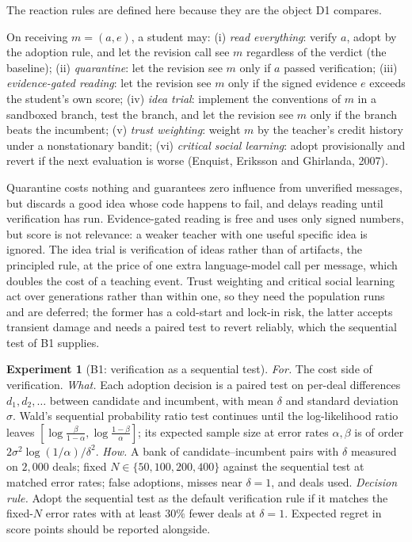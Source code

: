 \documentclass[11pt]{article}
\numberwithin{theorem}{section}
\theoremstyle{definition}
\theoremstyle{problemstyle}
\newtheorem{experiment}{Experiment}[section]
\begin{document}
The reaction rules are defined here because they are the object D1 compares.

\begin{definition}
On receiving $m=(a,e)$, a student may: (i) \emph{read everything}: verify $a$, adopt by the adoption rule, and let the
revision call see $m$ regardless of the verdict (the baseline); (ii) \emph{quarantine}: let the revision see $m$ only
if $a$ passed verification; (iii) \emph{evidence-gated reading}: let the revision see $m$ only if the signed evidence
$e$ exceeds the student's own score; (iv) \emph{idea trial}: implement the conventions of $m$ in a sandboxed branch, test
the branch, and let the revision see $m$ only if the branch beats the incumbent; (v) \emph{trust weighting}: weight
$m$ by the teacher's credit history under a nonstationary bandit; (vi) \emph{critical social learning}: adopt
provisionally and revert if the next evaluation is worse (Enquist, Eriksson and Ghirlanda, 2007).
\end{definition}

\begin{remark}
Quarantine costs nothing and guarantees zero influence from unverified messages, but discards a good idea whose code
happens to fail, and delays reading until verification has run. Evidence-gated reading is free and uses only signed
numbers, but score is not relevance: a weaker teacher with one useful specific idea is ignored. The idea trial is
verification of ideas rather than of artifacts, the principled rule, at the price of one extra language-model call per
message, which doubles the cost of a teaching event. Trust weighting and critical social learning act over
generations rather than within one, so they need the population runs and are deferred; the former has a cold-start
and lock-in risk, the latter accepts transient damage and needs a paired test to revert reliably, which the sequential
test of B1 supplies.
\end{remark}

\begin{experiment}[B1: verification as a sequential test]
\emph{For.} The cost side of verification.
\emph{What.} Each adoption decision is a paired test on per-deal differences $d_1,d_2,\dots$ between candidate and
incumbent, with mean $\delta$ and standard deviation $\sigma$. Wald's sequential probability ratio test continues
until the log-likelihood ratio leaves $[\log\tfrac{\beta}{1-\alpha},\log\tfrac{1-\beta}{\alpha}]$; its expected
sample size at error rates $\alpha,\beta$ is of order $2\sigma^2\log(1/\alpha)/\delta^2$.
\emph{How.} A bank of candidate--incumbent pairs with $\delta$ measured on $2{,}000$ deals; fixed $N\in\{50,100,200,400\}$
against the sequential test at matched error rates; false adoptions, misses near $\delta=1$, and deals used.
\emph{Decision rule.} Adopt the sequential test as the default verification rule if it matches the fixed-$N$ error rates
with at least $30\%$ fewer deals at $\delta=1$. Expected regret in score points should be reported alongside.
\end{experiment}
\end{document}
